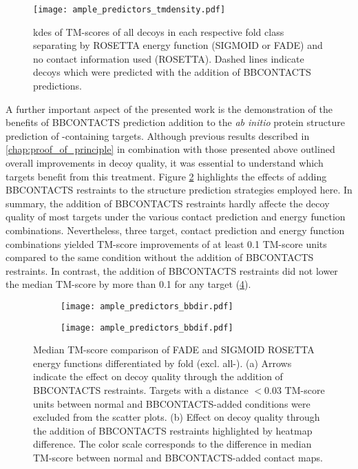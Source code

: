 \begin{figure}[H]
    \centering
    \texttt{[image: ample\_predictors\_tmdensity.pdf]}
    \caption[TM-score distribution by fold category and ROSETTA energy function]{\Gls{kde}s of TM-scores of all decoys in each respective fold class separating by ROSETTA energy function (SIGMOID or FADE) and no contact information used (ROSETTA). Dashed lines indicate decoys which were predicted with the addition of BBCONTACTS predictions.}
    \label{fig:ample_predictor_tmdensity}
\end{figure}

A further important aspect of the presented work is the demonstration of the benefits of BBCONTACTS prediction addition to the \textit{ab initio} protein structure prediction of \textbeta-containing targets. Although previous results described in \cref{chap:proof_of_principle} in combination with those presented above outlined overall improvements in decoy quality, it was essential to understand which targets benefit from this treatment. Figure \ref{fig:ample_predictor_bbdir} highlights the effects of adding BBCONTACTS restraints to the structure prediction strategies employed here. In summary, the addition of BBCONTACTS restraints hardly affecte the decoy quality of most targets under the various contact prediction and energy function combinations. Nevertheless, three target, contact prediction and energy function combinations yielded TM-score improvements of at least 0.1 TM-score units compared to the same condition without the addition of BBCONTACTS restraints. In contrast, the addition of BBCONTACTS restraints did not lower the median TM-score by more than 0.1 for any target (\cref{fig:ample_predictor_bbdif}).

\begin{figure}[H]
    \centering
    \begin{subfigure}[b]{\textwidth}
        \centering
        \texttt{[image: ample\_predictors\_bbdir.pdf]}
        \caption{}
        \label{fig:ample_predictor_bbdir}
    \end{subfigure}
    
    \begin{subfigure}[b]{\textwidth}
        \centering
        \texttt{[image: ample\_predictors\_bbdif.pdf]}
        \caption{}
        \label{fig:ample_predictor_bbdif}
    \end{subfigure}

    \caption[Median TM-score analysis by fold category and ROSETTA energy function]{Median TM-score comparison of FADE and SIGMOID ROSETTA energy functions differentiated by fold (excl. all-\textalpha). (a) Arrows indicate the effect on decoy quality through the addition of BBCONTACTS restraints. Targets with a distance $<0.03$ TM-score units between normal and BBCONTACTS-added conditions were excluded from the scatter plots. (b) Effect on decoy quality through the addition of BBCONTACTS restraints highlighted by heatmap difference. The color scale corresponds to the difference in median TM-score between normal and BBCONTACTS-added contact maps.}
\end{figure}

